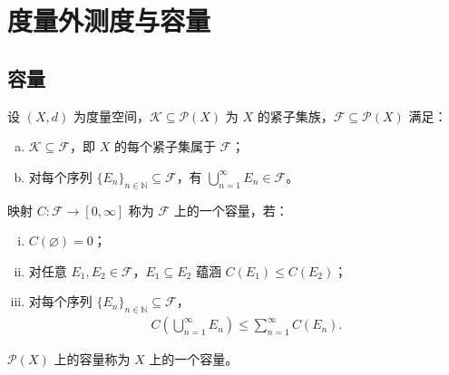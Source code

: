 \documentclass[../../main.tex]{subfiles}%
\begin{document}
\section{度量外测度与容量}\label{section:ch01-度量外测度容量}

\subsection{容量}\label{subsection:ch01-容量}

\begin{definition}[容量]\label{definition:ch01-容量}
设 $(X,d)$ 为度量空间，$\mathcal{K}\subseteq\mathcal{P}(X)$ 为 $X$ 的紧子集族，$\mathcal{F}\subseteq\mathcal{P}(X)$ 满足：
\begin{enumerate}[(a)]
\item $\mathcal{K}\subseteq\mathcal{F}$，即 $X$ 的每个紧子集属于 $\mathcal{F}$；
\item 对每个序列 $\{E_n\}_{n\in\mathbb{N}}\subseteq\mathcal{F}$，有 $\bigcup_{n=1}^\infty E_n\in\mathcal{F}$。
\end{enumerate}
映射 $C:\mathcal{F}\to[0,\infty]$ 称为 $\mathcal{F}$ 上的一个容量，若：
\begin{enumerate}[(i)]
\item $C(\varnothing)=0$；
\item 对任意 $E_1,E_2\in\mathcal{F}$，$E_1\subseteq E_2$ 蕴涵 $C(E_1)\leqslant C(E_2)$；
\item 对每个序列 $\{E_n\}_{n\in\mathbb{N}}\subseteq\mathcal{F}$，
\begin{align}
C\left(\bigcup_{n=1}^\infty E_n\right)\leqslant\sum_{n=1}^\infty C(E_n). \label{align:ch01-容量次可加}
\end{align}
\end{enumerate}
$\mathcal{P}(X)$ 上的容量称为 $X$ 上的一个容量。
\end{definition}
\end{document}
